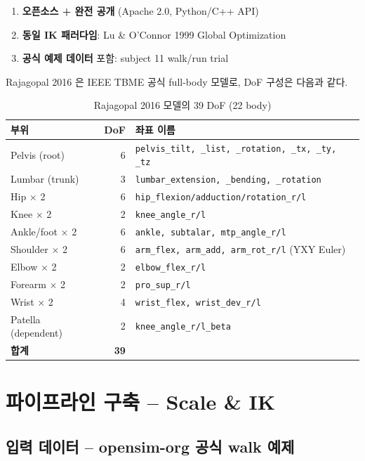 \documentclass[11pt, a4paper]{report}
\begin{document}
\begin{enumerate}
  \item \textbf{오픈소스 + 완전 공개} (Apache 2.0, Python/C++ API)
  \item \textbf{동일 IK 패러다임}: Lu \& O'Connor 1999 Global Optimization
  \item \textbf{공식 예제 데이터} 포함: subject 11 walk/run trial
\end{enumerate}

Rajagopal 2016 은 IEEE TBME 공식 full-body 모델로, DoF 구성은 다음과 같다.

\begin{table}[h!]
\centering
\caption{Rajagopal 2016 모델의 39 DoF (22 body)}
\begin{tabular}{l|r|l}
\toprule
\textbf{부위} & \textbf{DoF} & \textbf{좌표 이름} \\
\midrule
Pelvis (root) & 6 & \texttt{pelvis\_tilt, \_list, \_rotation, \_tx, \_ty, \_tz} \\
Lumbar (trunk) & 3 & \texttt{lumbar\_extension, \_bending, \_rotation} \\
Hip $\times$ 2 & 6 & \texttt{hip\_flexion/adduction/rotation\_r/l} \\
Knee $\times$ 2 & 2 & \texttt{knee\_angle\_r/l} \\
Ankle/foot $\times$ 2 & 6 & \texttt{ankle, subtalar, mtp\_angle\_r/l} \\
Shoulder $\times$ 2 & 6 & \texttt{arm\_flex, arm\_add, arm\_rot\_r/l} (YXY Euler) \\
Elbow $\times$ 2 & 2 & \texttt{elbow\_flex\_r/l} \\
Forearm $\times$ 2 & 2 & \texttt{pro\_sup\_r/l} \\
Wrist $\times$ 2 & 4 & \texttt{wrist\_flex, wrist\_dev\_r/l} \\
Patella (dependent) & 2 & \texttt{knee\_angle\_r/l\_beta} \\
\midrule
\textbf{합계} & \textbf{39} & \\
\bottomrule
\end{tabular}
\end{table}


\chapter{파이프라인 구축 -- Scale \& IK}

\section{입력 데이터 -- opensim-org 공식 walk 예제}
\end{document}
